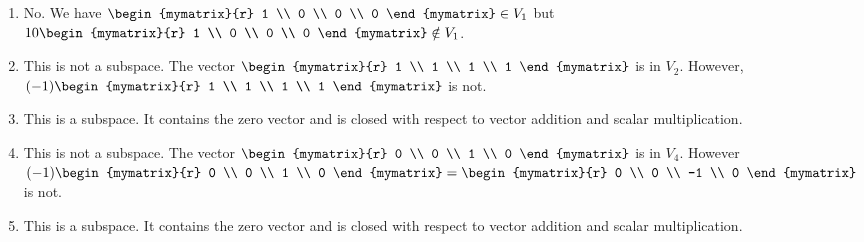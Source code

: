 \begin{ex}
  \begin{sol}
    \begin{enumerate}
    \item
      No. We have $\begin{mymatrix}{r}
        1 \\ 0 \\ 0 \\ 0
      \end{mymatrix} \in V_1$ but $10\begin{mymatrix}{r}
        1 \\ 0 \\ 0 \\ 0
      \end{mymatrix} \notin V_1$.
    \item
      This is not a subspace. The vector $\begin{mymatrix}{r}
        1 \\ 1 \\ 1 \\ 1
      \end{mymatrix} $
      is in $V_2$. However, $(-1) \begin{mymatrix}{r}
        1 \\ 1 \\ 1 \\ 1
      \end{mymatrix} $ is not.
    \item This is a subspace. It contains the zero vector and is
      closed with respect to vector addition and scalar
      multiplication.
    \item
      This
      is not a subspace. The vector $\begin{mymatrix}{r}
        0 \\ 0 \\ 1 \\ 0
      \end{mymatrix} $ is in $V_4$. However $(-1) \begin{mymatrix}{r}
        0 \\ 0 \\ 1 \\ 0
      \end{mymatrix}  = \begin{mymatrix}{r}
        0 \\ 0 \\ -1 \\ 0
      \end{mymatrix} $ is not.
    \item This is a subspace. It contains the zero vector and is
      closed with respect to vector addition and scalar
      multiplication.
    \end{enumerate}
  \end{sol}
\end{ex}

